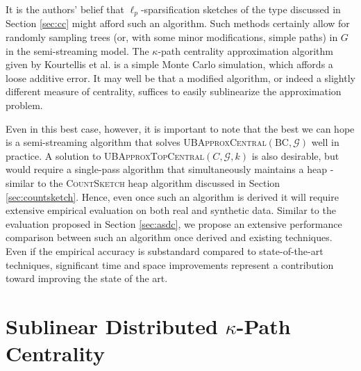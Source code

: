 \documentclass{report}
\newcommand{\algoname}[1]{\textnormal{\textsc{#1}}}
\begin{document}
It is the authors' belief that $\ell_p$-sparsification sketches of the type discussed in Section \ref{sec:cc} might afford such an algorithm. 
Such methods certainly allow for randomly sampling trees (or, with some minor modifications, simple paths) in $G$ in the semi-streaming model.
The $\kappa$-path centrality approximation algorithm given by Kourtellis et al. is a simple Monte Carlo simulation, which affords a loose additive error.
It may well be that a modified algorithm, or indeed a slightly different measure of centrality, suffices to easily sublinearize the approximation problem.

Even in this best case, however, it is important to note that the best we can hope is a semi-streaming algorithm that solves \algoname{UBApproxCentral}$(\textrm{BC}, \mathcal{G})$ well in practice. 
A solution to \algoname{UBApproxTopCentral}$(C, \mathcal{G}, k)$ is also desirable, but would require a single-pass algorithm that simultaneously maintains a heap - similar to the \algoname{CountSketch} heap algorithm discussed in Section \ref{sec:countsketch}. 
Hence, even once such an algorithm is derived it will require extensive empirical evaluation on both real and synthetic data.
Similar to the evaluation proposed in Section \ref{sec:asdc}, we propose an extensive performance comparison between such an algorithm once derived and existing techniques. 
Even if the empirical accuracy is substandard compared to state-of-the-art techniques, significant time and space improvements represent a contribution toward improving the state of the art. 


\section{Sublinear Distributed $\kappa$-Path Centrality}
 \label{kpath:sec:alg}
\end{document}
